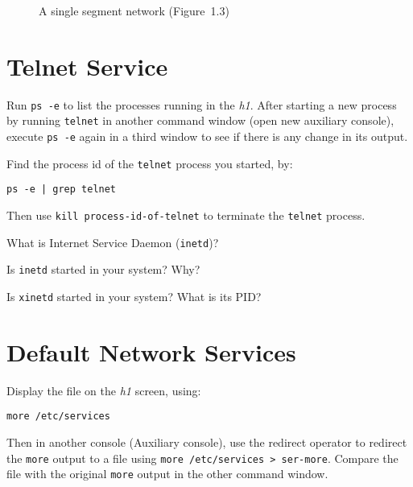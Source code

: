 \documentclass{../UTNetLab}
\begin{document}
\begin{center}
\begin{minipage}{0.48\textwidth}
\begin{flushright}
\begin{figure}[H]
                    \caption{A single segment network (Figure~1.3)}
                \end{figure}
            \end{flushright}
        \end{minipage}
    \end{center}

\section{Telnet Service}
    Run \lstinline{ps -e} to list the processes running in the \textit{h1}.
    After starting a new process by running \lstinline{telnet} in another command window (open new auxiliary console), execute \lstinline{ps -e} again in a third window to see if there is any change in its output.

    Find the process id of the \lstinline{telnet} process you started, by:
    \begin{lstlisting}
ps -e | grep telnet
    \end{lstlisting}
    Then use \lstinline[emph={process-id-of-telnet}]{kill process-id-of-telnet} to terminate the \lstinline{telnet} process.
    
    \begin{report}
        \item What is Internet Service Daemon (\lstinline{inetd})?

        \item Is \lstinline{inetd} started in your system? Why?

        \item Is \lstinline{xinetd} started in your system? What is its PID?
    \end{report}

\section{Default Network Services}
    Display the file  on the \textit{h1} screen, using:
    \begin{lstlisting}
more /etc/services
    \end{lstlisting}
    Then in another console (Auxiliary console), use the redirect operator to redirect the \lstinline{more} output to
    a file using \lstinline{more /etc/services > ser-more}.
    Compare the file  with the original \lstinline{more} output in the other command window.
\end{document}
